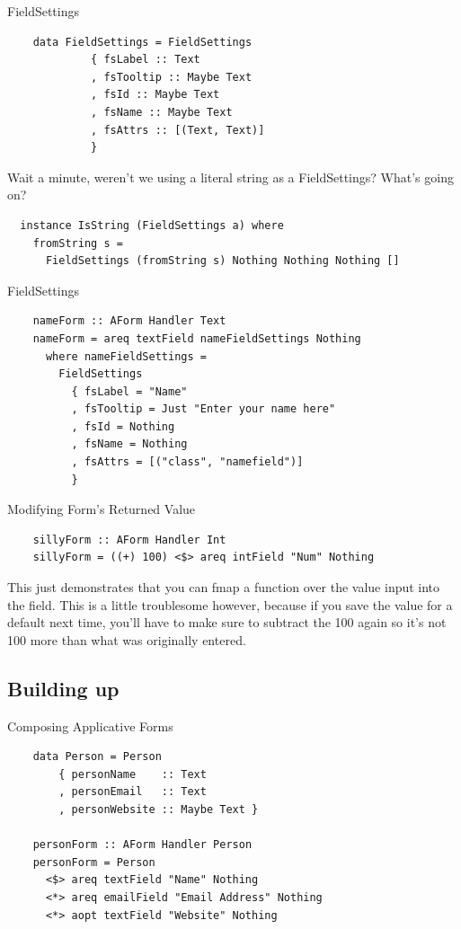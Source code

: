 \documentclass[pdf]{beamer}
\begin{document}
\begin{frame}[fragile]{FieldSettings}
  \begin{verbatim}
    data FieldSettings = FieldSettings
             { fsLabel :: Text
             , fsTooltip :: Maybe Text
             , fsId :: Maybe Text
             , fsName :: Maybe Text
             , fsAttrs :: [(Text, Text)]
             }
  \end{verbatim}
  \pause
  Wait a minute, weren't we using a literal string as a FieldSettings? What's going on?
  \pause
  \begin{verbatim}
  instance IsString (FieldSettings a) where
    fromString s =
      FieldSettings (fromString s) Nothing Nothing Nothing []
  \end{verbatim}
\end{frame}

\begin{frame}[fragile]{FieldSettings}
  \begin{verbatim}
    nameForm :: AForm Handler Text
    nameForm = areq textField nameFieldSettings Nothing
      where nameFieldSettings =
        FieldSettings
          { fsLabel = "Name"
          , fsTooltip = Just "Enter your name here"
          , fsId = Nothing
          , fsName = Nothing
          , fsAttrs = [("class", "namefield")]
          }
  \end{verbatim}
\end{frame}

\begin{frame}[fragile]{Modifying Form's Returned Value}
  \begin{verbatim}
    sillyForm :: AForm Handler Int
    sillyForm = ((+) 100) <$> areq intField "Num" Nothing
  \end{verbatim}
  This just demonstrates that you can fmap a function over the value
  input into the field. This is a little troublesome however, because
  if you save the value for a default next time, you'll have to make
  sure to subtract the 100 again so it's not 100 more than what was
  originally entered.
\end{frame}

\subsection{Building up}
\begin{frame}[fragile]{Composing Applicative Forms}
  \begin{verbatim}
    data Person = Person
        { personName    :: Text
        , personEmail   :: Text
        , personWebsite :: Maybe Text }

    personForm :: AForm Handler Person
    personForm = Person
      <$> areq textField "Name" Nothing
      <*> areq emailField "Email Address" Nothing
      <*> aopt textField "Website" Nothing
  \end{verbatim}
\end{frame}
\end{document}
